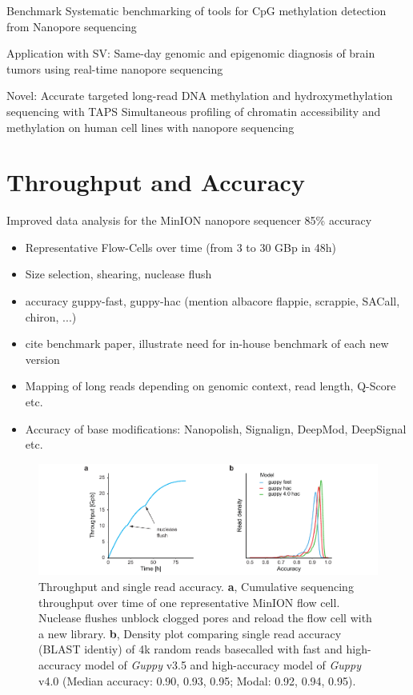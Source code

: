 Benchmark
Systematic benchmarking of tools for CpG methylation detection from Nanopore sequencing \cite{Yuen2020}

Application with SV:
Same-day genomic and epigenomic diagnosis of brain tumors using real-time nanopore sequencing \cite{Euskirchen2017}

Novel:
Accurate targeted long-read DNA methylation and hydroxymethylation sequencing with TAPS \cite{Liu2020}
Simultaneous profiling of chromatin accessibility and methylation on human cell lines with nanopore sequencing \cite{Lee2020}




\section{Throughput and Accuracy}
\label{sec:stat_of_art:throughput}

Improved data analysis for the {MinION} nanopore sequencer \cite{Jain2015} 85\% accuracy

\begin{itemize}
    \item Representative Flow-Cells over time (from 3 to 30 GBp in 48h)
    \item Size selection, shearing, nuclease flush
    \item accuracy guppy-fast, guppy-hac (mention albacore flappie, scrappie, SACall, chiron, ...)
    \item cite benchmark paper, illustrate need for in-house benchmark of each new version
    \item Mapping of long reads depending on genomic context, read length, Q-Score etc.
    \item Accuracy of base modifications: Nanopolish, Signalign, DeepMod, DeepSignal etc.
\end{itemize}

\begin{figure}[h]
    \centering
    \includegraphics[width=1.0\textwidth]{figures/state_of_art/throughput.pdf}
    \captionsetup{format=plain}
    \caption[Throughput and accuracy]{Throughput and single read accuracy. \textbf{a}, Cumulative sequencing throughput over time of one representative MinION flow cell. Nuclease flushes unblock clogged pores and reload the flow cell with a new library. \textbf{b}, Density plot comparing single read accuracy (BLAST identiy) of 4k random reads basecalled with fast and high-accuracy model of \textit{Guppy} v3.5 and high-accuracy model of \textit{Guppy} v4.0 (Median accuracy: 0.90, 0.93, 0.95; Modal: 0.92, 0.94, 0.95).}
    \label{fig:state_of_art:throughput}
\end{figure}

